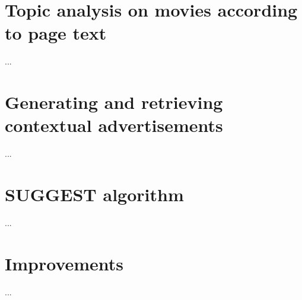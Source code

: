\documentclass[11pt]{article}
\begin{document}
\section{Topic analysis on movies according to page text}

...

\section{Generating and retrieving contextual advertisements}

...

\section{SUGGEST algorithm}

...

\section{Improvements}

...
\end{document}
